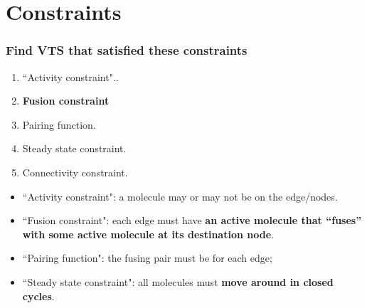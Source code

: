 \documentclass{beamer}
\theoremstyle{definition}
\theoremstyle{remark}
\begin{document}
\section{Constraints}

\begin{frame}
\frametitle{Find VTS that satisfied these constraints}
\begin{enumerate}
\item {\color{blue} {``Activity constraint"}}.. \\

\item \textbf{Fusion constraint} \\

\item Pairing function. \\ 

\item Steady state constraint. \\

\item Connectivity constraint. \\

\end{enumerate}
\end{frame}

\begin{frame}
\begin{itemize}
        	\item {\color{blue} {``Activity constraint"}}: a molecule may or may not be {\color{brilliantrose}{active}} on the edge/nodes. 
\end{itemize} 
\end{frame}
            
     \begin{frame}
\begin{itemize}
            \item {\color{blue} {``Fusion constraint"}}: each edge must have \textbf{an active molecule that “fuses” with some active molecule at its destination node}.
                 \end{itemize} 
\end{frame}

 \begin{frame}
\begin{itemize}
            \item {\color{blue} {``Pairing function"}}: the fusing pair must be {\color{brilliantrose}{unique}} for each edge; 
                     \end{itemize} 
\end{frame}
\begin{frame}
\begin{itemize}
            \item {\color{blue} {``Steady state constraint"}}: all molecules must \textbf{move around in closed cycles}.
            \end{itemize} 
\end{frame}
\end{document}
